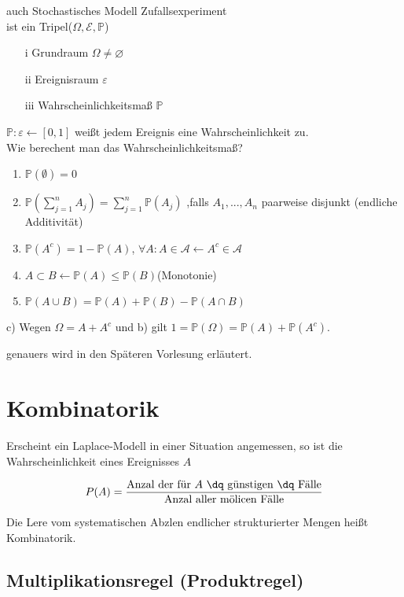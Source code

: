 auch Stochastisches Modell Zufallsexperiment\\
ist ein Tripel($\Omega ,\mathcal{E}, \mathbb{P}$)
\begin{itemize}
    \item [i] Grundraum $\Omega\neq \varnothing  $
    \item [ii] Ereignisraum $\varepsilon $
    \item [iii] Wahrscheinlichkeitsmaß $\mathbb{P}$
\end{itemize}
$\mathbb{P} :\varepsilon \longleftarrow [0,1]$ weißt jedem Ereignis eine Wahrscheinlichkeit zu.\\

Wie berechent man das Wahrscheinlichkeitsmaß?\\
\renewcommand{\labelenumi}{\alph{enumi})}
\begin{enumerate}
    \item $\mathbb{P}(\emptyset) = 0$
    \item $\mathbb{P} (\sum_{j = 1}^{n} A_j)=\sum_{j = 1}^{n}\mathbb{P} (A_j) $ ,falls $A_1,...,A_n$ paarweise disjunkt (endliche Additivität)
    \item $\mathbb{P} (A^c)= 1-\mathbb{P} (A)$, $\forall A:A\in \mathcal{A} \longleftarrow A^c\in \mathcal{A} $
    \item $A\subset B \longleftarrow \mathbb{P}(A)\leq \mathbb{P} (B)$(Monotonie)
    \item $\mathbb{P} (A\cup B)=\mathbb{P} (A)+\mathbb{P} (B)-\mathbb{P} (A\cap B)$
\end{enumerate}
c) Wegen $\Omega = A+A^c$ und b) gilt $1 = \mathbb{P} (\Omega)=\mathbb{P} (A)+\mathbb{P} (A^c)$.

genauers wird in den Späteren Vorlesung erläutert.\\

\section{Kombinatorik}
Erscheint ein Laplace-Modell in einer Situation angemessen, so ist die Wahrscheinlichkeit eines Ereignisses $A$

\[P(A)=\frac{\textrm{Anzal der für $A$ \dq günstigen \dq Fälle}}{\textrm{Anzal aller mölicen Fälle}} \]

Die Lere vom systematischen Abzlen endlicher \dq strukturierter \dq Mengen heißt Kombinatorik.

\subsection{Multiplikationsregel (Produktregel)}

